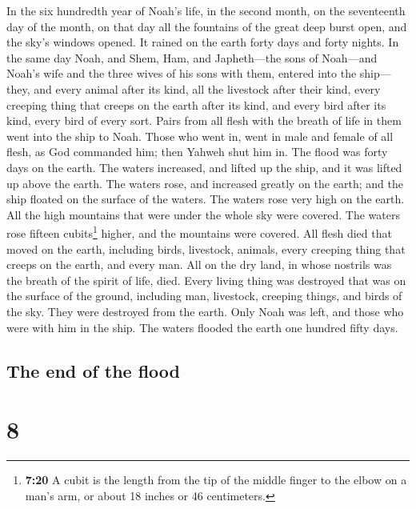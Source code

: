  In the six hundredth year of Noah's life, in the second
month, on the seventeenth day of the month, on that day all the
fountains of the great deep burst open, and the sky's windows opened.
 It rained on the earth forty days and forty nights.
 In the same day Noah, and Shem, Ham, and Japheth---the
sons of Noah---and Noah's wife and the three wives of his sons with
them, entered into the ship---  they, and every animal
after its kind, all the livestock after their kind, every creeping thing
that creeps on the earth after its kind, and every bird after its kind,
every bird of every sort.  Pairs from all flesh with the
breath of life in them went into the ship to Noah.  Those
who went in, went in male and female of all flesh, as God commanded him;
then Yahweh shut him in.  The flood was forty days on the
earth. The waters increased, and lifted up the ship, and it was lifted
up above the earth.  The waters rose, and increased
greatly on the earth; and the ship floated on the surface of the waters.
 The waters rose very high on the earth. All the high
mountains that were under the whole sky were covered. 
The waters rose fifteen cubits\footnote{\textbf{7:20} A cubit is the
  length from the tip of the middle finger to the elbow on a man's arm,
  or about 18 inches or 46 centimeters.} higher, and the mountains were
covered.  All flesh died that moved on the earth,
including birds, livestock, animals, every creeping thing that creeps on
the earth, and every man.  All on the dry land, in whose
nostrils was the breath of the spirit of life, died. 
Every living thing was destroyed that was on the surface of the ground,
including man, livestock, creeping things, and birds of the sky. They
were destroyed from the earth. Only Noah was left, and those who were
with him in the ship.  The waters flooded the earth one
hundred fifty days.

\hypertarget{the-end-of-the-flood}{%
\subsection{The end of the flood}\label{the-end-of-the-flood}}

\hypertarget{section-7}{%
\section{8}\label{section-7}}

